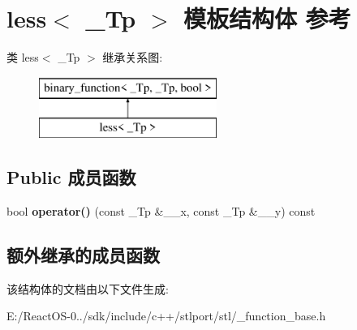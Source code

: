\hypertarget{structless}{}\section{less$<$ \+\_\+\+Tp $>$ 模板结构体 参考}
\label{structless}
类 less$<$ \+\_\+\+Tp $>$ 继承关系图\+:\begin{figure}[H]
\begin{center}
\leavevmode
\includegraphics[height=2.000000cm]{structless}
\end{center}
\end{figure}
\subsection*{Public 成员函数}
\begin{DoxyCompactItemize}
\item 
\mbox{\label{structless_ac174b6cde2a015afe6378905b91939e4}} 
bool {\bfseries operator()} (const \+\_\+\+Tp \&\+\_\+\+\_\+x, const \+\_\+\+Tp \&\+\_\+\+\_\+y) const
\end{DoxyCompactItemize}
\subsection*{额外继承的成员函数}


该结构体的文档由以下文件生成\+:\begin{DoxyCompactItemize}
\item 
E\+:/\+React\+O\+S-\/0../sdk/include/c++/stlport/stl/\+\_\+function\+\_\+base.\+h\end{DoxyCompactItemize}
